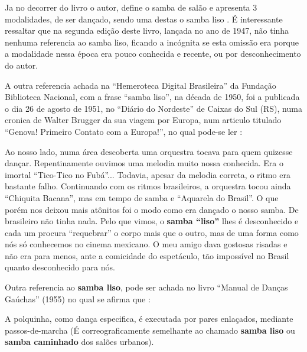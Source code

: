 Ja no decorrer do livro o autor, define o samba de salão e apresenta 3 modalidades,
de ser dançado, sendo uma destas o samba liso \cite[pp. 61]{fornaciari1950aprender}.
É interessante ressaltar que na segunda edição deste livro, lançada no ano de 1947,
não tinha nenhuma referencia ao samba liso, ficando a incógnita se esta omissão era
porque a modalidade nessa época era pouco conhecida e recente, ou por desconhecimento do autor.



A outra referencia achada na ``Hemeroteca Digital Brasileira'' da Fundação Biblioteca Nacional,
com a frase ``samba liso'', na década de 1950, foi a publicada o dia 26 de agosto de 1951,
no ``Diário do Nordeste'' de Caixas do Sul (RS), numa cronica de Walter Brugger da sua viagem por Europa,
num articulo titulado ``Genova! Primeiro Contato com a Europa!'',
no qual pode-se ler \cite[pp. 10]{nordestesambalisocronica}:
\begin{citando}
Ao nosso lado, numa área 
descoberta uma orquestra tocava para
quem quizesse dançar.
Repentinamente ouvimos uma melodia muito
nossa conhecida. Era o imortal ``Tico-Tico no Fubá''... Todavia,
apesar da melodia correta, o ritmo
era bastante falho. Continuando 
com os ritmos brasileiros, a orquestra 
tocou ainda ``Chiquita Bacana'',
mas em tempo de samba e ``Aquarela do Brasil''.
O que porém nos 
deixou mais atônitos foi o modo como 
era dançado o nosso samba. De 
brasileiro não tinha nada. Pelo que 
vimos, o \textbf{samba ``liso''} lhes é desconhecido 
e cada um procura ``requebrar'' o corpo mais que o outro,
mas de uma forma como nós só 
conhecemos no cinema mexicano. 
O meu amigo dava gostosas risadas e não era para menos,
ante a comicidade do espetáculo, tão 
impossível no Brasil quanto desconhecido para nós.
\end{citando}



Outra referencia ao \textbf{samba liso}, pode ser achada no livro ``Manual de Danças Gaúchas'' (1955)
no qual se afirma que \cite[pp. 77]{cortesmanual}: 
\begin{citando}
A polquinha, como dança especifica, é executada por pares enlaçados,
mediante passos-de-marcha (É correograficamente  semelhante ao chamado 
\textbf{samba liso} ou \textbf{samba caminhado} dos salões urbanos).
\end{citando}~\\

